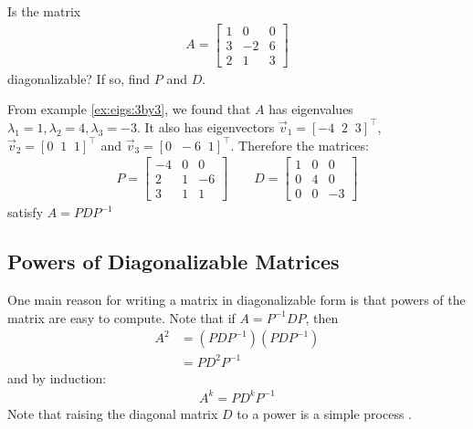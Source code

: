 \begin{example}
Is the matrix
\begin{align*}
A =
\begin{bmatrix}
1 & 0 & 0 \\
3 & -2 & 6 \\
2 & 1 & 3
\end{bmatrix}
\end{align*}
%
diagonalizable? If so, find $P$ and $D$. 

\solution

From example \ref{ex:eigs:3by3}, we found that $A$ has eigenvalues $\lambda_1 = 1, \lambda_2 = 4, \lambda_3 = -3$.  It also has eigenvectors $\vec{v}_1 =[-4\;\;2\;\;3]^{\intercal} $, $\vec{v}_2 =[0\;\;1\;\;1]^{\intercal}$ and $\vec{v}_3=[0\;\;-6\;\;1]^{\intercal}$.  Therefore the matrices:
%
\begin{align*}
P = \begin{bmatrix}
-4 & 0 & 0 \\
2 & 1 & -6 \\
3 & 1 & 1
\end{bmatrix} \qquad
D = 
\begin{bmatrix}
1 & 0 & 0 \\ 0 & 4 & 0 \\ 0 & 0 & -3
\end{bmatrix}
\end{align*}
%
satisfy $A = PDP^{-1}$

\end{example}


\subsection*{Powers of Diagonalizable Matrices}

One main reason for writing a matrix in diagonalizable form is that powers of the matrix are easy to compute.  Note that if $A = P^{-1} DP$,  then 
%
\begin{align*}
A^2 & = ( PDP^{-1})(PDP^{-1}) \\
& = PD^2P^{-1} 
\end{align*}
%
and by induction:
%
\begin{align*}
A^k = PD^k P^{-1}
\end{align*}
%
Note that raising the diagonal matrix $D$ to a power is a simple process .


